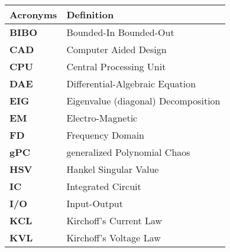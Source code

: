 \begin{singlespace}
\begin{flushleft}
\begin{longtable}{ll}
\hline
\textbf{Acronyms} & \textbf{Definition} \\
\hline\hline
%
{\bfseries BIBO}  &   Bounded-In Bounded-Out\\
{\bfseries CAD}   &   Computer Aided Design\\
{\bfseries CPU}   &   Central Processing Unit\\
{\bfseries DAE}   &   Differential-Algebraic Equation\\
{\bfseries EIG}   &   Eigenvalue (diagonal) Decomposition \\
{\bfseries EM }   &   Electro-Magnetic\\
{\bfseries FD}    &   Frequency Domain\\
%
{\bfseries gPC}   &  generalized Polynomial Chaos \\ 
%
{\bfseries HSV}   &   Hankel Singular Value\\ 
%
{\bfseries IC}    &   Integrated Circuit\\
{\bfseries I/O}   &   Input-Output\\
%
{\bfseries KCL}   &   Kirchoff's Current Law\\
{\bfseries KVL}   &   Kirchoff's Voltage Law\\
%
\hline
\end{longtable} 
\end{flushleft}
\end{singlespace}
\vfill


